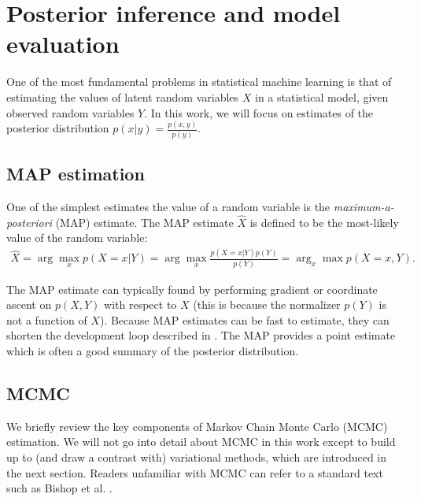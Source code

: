 
\section{Posterior inference and model evaluation}
One of the most fundamental problems in statistical machine learning
is that of estimating the values of latent random variables $X$ in a
statistical model, given observed random variables $Y$.  In this work, we will
focus on estimates of the posterior distribution $p(x | y) =
\frac{p(x, y)}{p(y)}$.

\subsection{MAP estimation}
One of the simplest estimates the value of a random variable is the \emph{maximum-a-posteriori} (MAP) estimate.  The MAP estimate $\hat X$ is defined to be the most-likely value of the random variable:
\begin{align}
  \hat X = \arg \max_x p(X=x | Y) = \arg \max_x \frac{p(X=x | Y) p(Y)}{p(Y)} = \arg_x \max p(X=x, Y).
\end{align}

The MAP estimate can typically found by performing gradient or
coordinate ascent on $p(X, Y)$ with respect to $X$ (this is because
the normalizer $p(Y)$ is not a function of $X$).  Because MAP
estimates can be fast to estimate, they can shorten the development
loop described in . The MAP provides a point estimate
which is often a good summary of the posterior distribution.

\subsection{MCMC}


We briefly review the key components of Markov Chain Monte Carlo
(MCMC) estimation.  We will not go into detail about MCMC in this work
except to build up to (and draw a contrast with) variational methods,
which are introduced in the next section. Readers unfamiliar with MCMC
can refer to a standard text such as Bishop et al. \cite{bishop:2006}.


